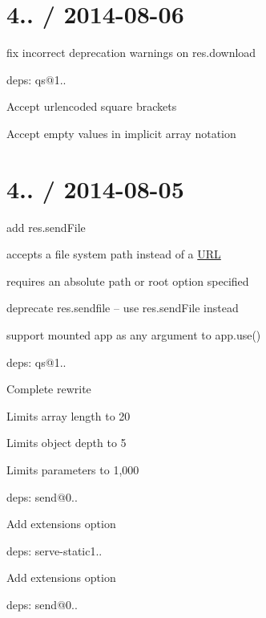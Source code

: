 {\ttfamily \section*{4.. / 2014-\/08-\/06 }}

{\ttfamily }

{\ttfamily 
\begin{DoxyItemize}
\item fix incorrect deprecation warnings on {\ttfamily res.\+download}
\item deps\+: qs@1..
\begin{DoxyItemize}
\item Accept urlencoded square brackets
\item Accept empty values in implicit array notation
\end{DoxyItemize}
\end{DoxyItemize}}

{\ttfamily \section*{4.. / 2014-\/08-\/05 }}

{\ttfamily }

{\ttfamily 
\begin{DoxyItemize}
\item add {\ttfamily res.\+send\+File}
\begin{DoxyItemize}
\item accepts a file system path instead of a \mbox{\hyperlink{namespace_u_r_l}{U\+RL}}
\item requires an absolute path or {\ttfamily root} option specified
\end{DoxyItemize}
\item deprecate {\ttfamily res.\+sendfile} -- use {\ttfamily res.\+send\+File} instead
\item support mounted app as any argument to {\ttfamily app.\+use()}
\item deps\+: qs@1..
\begin{DoxyItemize}
\item Complete rewrite
\item Limits array length to 20
\item Limits object depth to 5
\item Limits parameters to 1,000
\end{DoxyItemize}
\item deps\+: send@0..
\begin{DoxyItemize}
\item Add {\ttfamily extensions} option
\end{DoxyItemize}
\item deps\+: serve-\/static1..
\begin{DoxyItemize}
\item Add {\ttfamily extensions} option
\item deps\+: send@0..
\end{DoxyItemize}
\end{DoxyItemize}}

